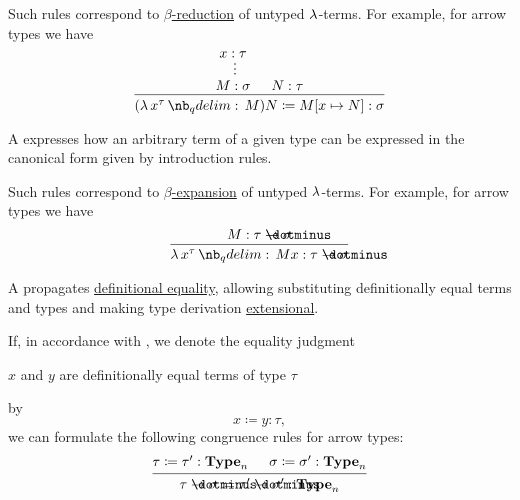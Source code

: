\begin{remark}
\begin{thmenum}
\begin{thmenum}
      Such rules correspond to \hyperref[def:beta_eta_reduction]{\( \beta \)-reduction} of untyped \( \mathrm{\lambda} \)-terms. For example, for arrow types we have
      \begin{equation*}
        \begin{prooftree}
          \hypo{ x: \tau }
          \ellipsis {} { M: \sigma }

          \hypo{ N: \tau }
          \infer2{ (\qabs {x^\tau} M) N \coloneqq M[x \mapsto N]: \sigma }.
        \end{prooftree}
      \end{equation*}

       A  expresses how an arbitrary term of a given type can be expressed in the canonical form given by introduction rules.

      Such rules correspond to \hyperref[def:beta_eta_reduction]{\( \beta \)-expansion} of untyped \( \mathrm{\lambda} \)-terms. For example, for arrow types we have
      \begin{equation*}
        \begin{prooftree}
          \hypo{ M: \tau \synimplies \sigma }
          \infer1{ \qabs {x^\tau} M x: \tau \synimplies \sigma }.
        \end{prooftree}
      \end{equation*}

       A  propagates \hyperref[con:equality]{definitional equality}, allowing substituting definitionally equal terms and types and making type derivation \hyperref[con:extensionality]{extensional}.

      If, in accordance with , we denote the equality judgment
      \begin{center}
        \( x \) and \( y \) are definitionally equal terms of type \( \tau \)
      \end{center}
      by
      \begin{equation*}
        x \coloneqq y: \tau,
      \end{equation*}
      we can formulate the following congruence rules for arrow types:
      \begin{equation*}
        \begin{prooftree}
          \hypo{ \tau \coloneqq \tau': \op*{Type}_n }
          \hypo{ \sigma \coloneqq \sigma': \op*{Type}_n }
          \infer2{ \tau \synimplies \sigma \coloneqq \tau' \synimplies \sigma': \op*{Type}_n }
        \end{prooftree}
      \end{equation*}


\end{thmenum}
\end{thmenum}
\end{remark}
